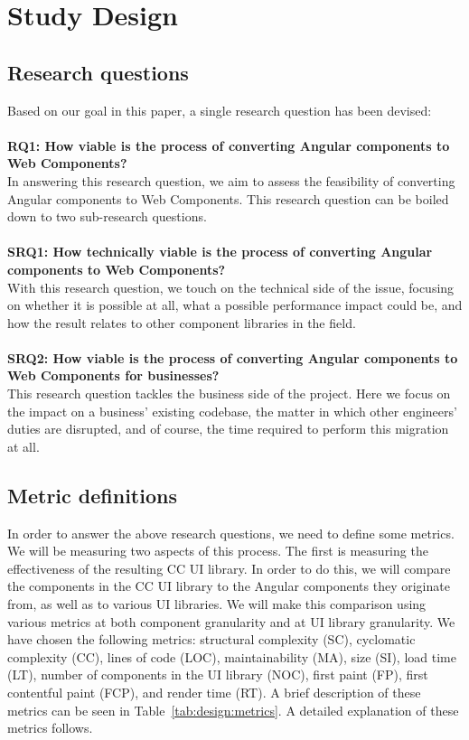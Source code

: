 \chapter{Study Design}\label{chap:design}

\section{Research questions}
Based on our goal in this paper, a single research question has been devised:
\\
\\
\textbf{RQ1: How viable is the process of converting Angular components to Web Components?}
\\
In answering this research question, we aim to assess the feasibility of converting Angular components to Web Components. This research question can be boiled down to two sub-research questions.
\\
\\
\textbf{SRQ1: How technically viable is the process of converting Angular components to Web Components?}
\\
With this research question, we touch on the technical side of the issue, focusing on whether it is possible at all, what a possible performance impact could be, and how the result relates to other component libraries in the field.
\\
\\
\textbf{SRQ2: How viable is the process of converting Angular components to Web Components for businesses?}
\\
This research question tackles the business side of the project. Here we focus on the impact on a business' existing codebase, the matter in which other engineers' duties are disrupted, and of course, the time required to perform this migration at all.


\section{Metric definitions}
In order to answer the above research questions, we need to define some metrics. We will be measuring two aspects of this process. The first is measuring the effectiveness of the resulting CC UI library. In order to do this, we will compare the components in the CC UI library to the Angular components they originate from, as well as to various UI libraries. We will make this comparison using various metrics at both component granularity and at UI library granularity. We have chosen the following metrics: structural complexity (SC), cyclomatic complexity (CC), lines of code (LOC), maintainability (MA), size (SI), load time (LT), number of components in the UI library (NOC), first paint (FP), first contentful paint (FCP), and render time (RT).  A brief description of these metrics can be seen in Table~\ref{tab:design:metrics}. A detailed explanation of these metrics follows.


